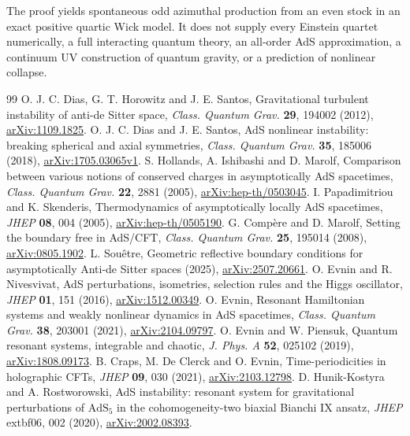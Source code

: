\documentclass[11pt]{article}
\numberwithin{equation}{section}
\begin{document}
The proof yields spontaneous odd azimuthal production
from an even stock in an exact positive quartic Wick model.
It does not supply every Einstein quartet numerically, a full
interacting quantum theory, an all-order AdS approximation,
a continuum UV construction of quantum gravity, or a
prediction of nonlinear collapse.

\begin{thebibliography}{99}
O. J. C. Dias, G. T. Horowitz and J. E. Santos,
Gravitational turbulent instability of anti-de Sitter space,
\emph{Class. Quantum Grav.} \textbf{29}, 194002 (2012),
\href{https://arxiv.org/abs/1109.1825}{arXiv:1109.1825}.
O. J. C. Dias and J. E. Santos, AdS nonlinear instability:
breaking spherical and axial symmetries,
\emph{Class. Quantum Grav.} \textbf{35}, 185006 (2018),
\href{https://arxiv.org/html/1705.03065v1}{arXiv:1705.03065v1}.
S. Hollands, A. Ishibashi and D. Marolf,
Comparison between various notions of conserved charges in
asymptotically AdS spacetimes,
\emph{Class. Quantum Grav.} \textbf{22}, 2881 (2005),
\href{https://arxiv.org/abs/hep-th/0503045}{arXiv:hep-th/0503045}.
I. Papadimitriou and K. Skenderis,
Thermodynamics of asymptotically locally AdS spacetimes,
\emph{JHEP} \textbf{08}, 004 (2005),
\href{https://arxiv.org/abs/hep-th/0505190}{arXiv:hep-th/0505190}.
G. Comp\`ere and D. Marolf,
Setting the boundary free in AdS/CFT,
\emph{Class. Quantum Grav.} \textbf{25}, 195014 (2008),
\href{https://arxiv.org/abs/0805.1902}{arXiv:0805.1902}.
L. Sou\^etre, Geometric reflective boundary conditions for
asymptotically Anti-de Sitter spaces (2025), \href{https://arxiv.org/abs/2507.20661}{arXiv:2507.20661}.
O. Evnin and R. Nivesvivat,
AdS perturbations, isometries, selection rules and the Higgs oscillator,
\emph{JHEP} \textbf{01}, 151 (2016),
\href{https://arxiv.org/abs/1512.00349}{arXiv:1512.00349}.
O. Evnin, Resonant Hamiltonian systems and weakly nonlinear dynamics
in AdS spacetimes,
\emph{Class. Quantum Grav.} \textbf{38}, 203001 (2021),
\href{https://arxiv.org/abs/2104.09797}{arXiv:2104.09797}.
O. Evnin and W. Piensuk, Quantum resonant systems, integrable and chaotic,
\emph{J. Phys. A} \textbf{52}, 025102 (2019),
\href{https://arxiv.org/abs/1808.09173}{arXiv:1808.09173}.
B. Craps, M. De Clerck and O. Evnin,
Time-periodicities in holographic CFTs,
\emph{JHEP} \textbf{09}, 030 (2021),
\href{https://arxiv.org/abs/2103.12798}{arXiv:2103.12798}.
D. Hunik-Kostyra and A. Rostworowski,
AdS instability: resonant system for gravitational perturbations
of \(\mathrm{AdS}_5\) in the cohomogeneity-two biaxial Bianchi IX ansatz,
\emph{JHEP} 	extbf{06}, 002 (2020),
\href{https://arxiv.org/abs/2002.08393}{arXiv:2002.08393}.
\end{thebibliography}
\end{document}
